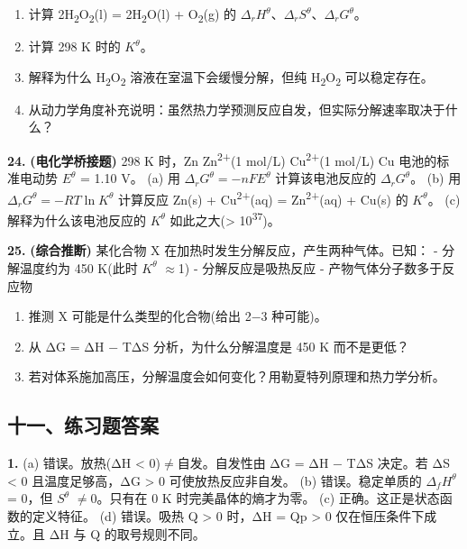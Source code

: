 \documentclass[a4paper,11pt]{ctexart}
\providecommand{\tightlist}{\setlength{\itemsep}{0pt}\setlength{\parskip}{0pt}}
\newcommand{\箭}{\ensuremath{\rightarrow}}
\newcommand{\左箭}{\ensuremath{\leftarrow}}
\newcommand{\上箭}{\ensuremath{\uparrow}}
\newcommand{\下箭}{\ensuremath{\downarrow}}
\newcommand{\衡}{\ensuremath{\rightleftharpoons}}
\newcommand{\双箭}{\ensuremath{\leftrightarrow}}
\newcommand{\约等于}{\ensuremath{\approx}}
\newcommand{\小于等于}{\ensuremath{\leq}}
\newcommand{\大于等于}{\ensuremath{\geq}}
\newcommand{\不等于}{\ensuremath{\neq}}
\newcommand{\西格马}{\ensuremath{\sigma}}
\newcommand{\派}{\ensuremath{\pi}}
\begin{document}
\begin{enumerate}
\def\labelenumi{(\alph{enumi})}
\tightlist
\item
  计算 2H\textsubscript{2}O\textsubscript{2}(l) = 2H\textsubscript{2}O(l) + O\textsubscript{2}(g) 的 \(\Delta_r H^\theta\)、\(\Delta_r S^\theta\)、\(\Delta_r G^\theta\)。
\item
  计算 298 K 时的 \(K^\theta\)。
\item
  解释为什么 H\textsubscript{2}O\textsubscript{2} 溶液在室温下会缓慢分解，但纯 H\textsubscript{2}O\textsubscript{2} 可以稳定存在。
\item
  从动力学角度补充说明：虽然热力学预测反应自发，但实际分解速率取决于什么？
\end{enumerate}

\textbf{24.} \textbf{(电化学桥接题)} 298 K 时，Zn \textbar{} Zn\textsuperscript{2+}(1 mol/L) \textbar\textbar{} Cu\textsuperscript{2+}(1 mol/L) \textbar{} Cu 电池的标准电动势 \(E^\theta\) = 1.10 V。
(a) 用 \(\Delta_r G^\theta = -nFE^\theta\) 计算该电池反应的 \(\Delta_r G^\theta\)。
(b) 用 \(\Delta_r G^\theta = -RT \ln K^\theta\) 计算反应 Zn(s) + Cu\textsuperscript{2+}(aq) = Zn\textsuperscript{2+}(aq) + Cu(s) 的 \(K^\theta\)。
(c) 解释为什么该电池反应的 \(K^\theta\) 如此之大(\textgreater{} 10\textsuperscript{37})。

\textbf{25.} \textbf{(综合推断)} 某化合物 X 在加热时发生分解反应，产生两种气体。已知：
- 分解温度约为 450 K(此时 \(K^\theta\) \约等于 1)
- 分解反应是吸热反应
- 产物气体分子数多于反应物

\begin{enumerate}
\def\labelenumi{(\alph{enumi})}
\tightlist
\item
  推测 X 可能是什么类型的化合物(给出 2−3 种可能)。
\item
  从 ΔG = ΔH − TΔS 分析，为什么分解温度是 450 K 而不是更低？
\item
  若对体系施加高压，分解温度会如何变化？用勒夏特列原理和热力学分析。
\end{enumerate}

\subsection{十一、练习题答案}\label{ux5341ux4e00ux7ec3ux4e60ux9898ux7b54ux6848}

\textbf{1.}
(a) 错误。放热(ΔH \textless{} 0)\不等于 自发。自发性由 ΔG = ΔH − TΔS 决定。若 ΔS \textless{} 0 且温度足够高，ΔG \textgreater{} 0 可使放热反应非自发。
(b) 错误。稳定单质的 \(\Delta_f H^\theta\) = 0，但 \(S^\theta\) \不等于 0。只有在 0 K 时完美晶体的熵才为零。
(c) 正确。这正是状态函数的定义特征。
(d) 错误。吸热 Q \textgreater{} 0 时，ΔH = Qp \textgreater{} 0 仅在恒压条件下成立。且 ΔH 与 Q 的取号规则不同。
\end{document}

